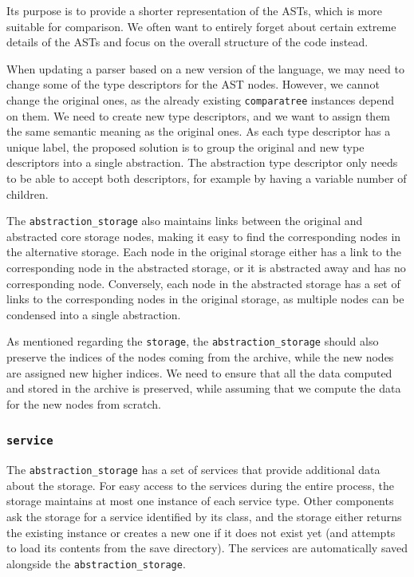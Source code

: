 Its purpose is to provide a shorter representation of the ASTs, which is more suitable for comparison.
We often want to entirely forget about certain extreme details of the ASTs and focus on the overall structure of the code instead.

When updating a parser based on a new version of the language, we may need to change some of the type descriptors for the AST nodes.
However, we cannot change the original ones, as the already existing \texttt{comparatree} instances depend on them.
We need to create new type descriptors, and we want to assign them the same semantic meaning as the original ones.
As each type descriptor has a unique label, the proposed solution is to group the original and new type descriptors into a single abstraction.
The abstraction type descriptor only needs to be able to accept both descriptors, for example by having a variable number of children.

The \texttt{abstraction\_storage} also maintains links between the original and abstracted core storage nodes, making it easy to find the corresponding nodes in the alternative storage.
Each node in the original storage either has a link to the corresponding node in the abstracted storage, or it is abstracted away and has no corresponding node.
Conversely, each node in the abstracted storage has a set of links to the corresponding nodes in the original storage, as multiple nodes can be condensed into a single abstraction.

As mentioned regarding the \texttt{storage}, the \texttt{abstraction\_storage} should also preserve the indices of the nodes coming from the archive, while the new nodes are assigned new higher indices.
We need to ensure that all the data computed and stored in the archive is preserved, while assuming that we compute the data for the new nodes from scratch.

\subsubsection{\texttt{service}}

The \texttt{abstraction\_storage} has a set of services that provide additional data about the storage.
For easy access to the services during the entire process, the storage maintains at most one instance of each service type.
Other components ask the storage for a service identified by its class, and the storage either returns the existing instance or creates a new one if it does not exist yet (and attempts to load its contents from the save directory).
The services are automatically saved alongside the \texttt{abstraction\_storage}.

